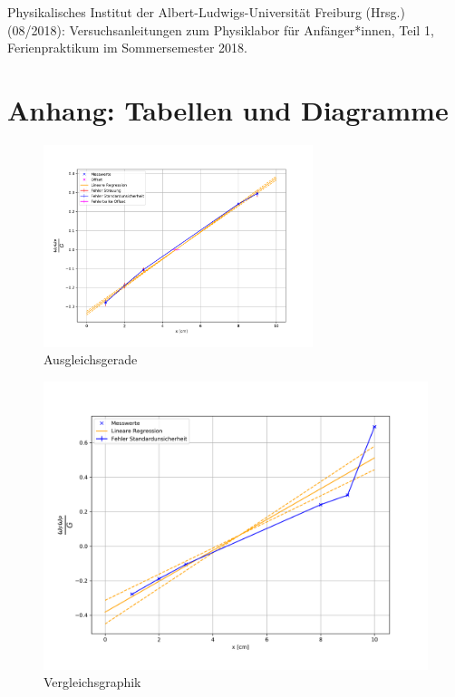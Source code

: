 \documentclass[11pt,a4paper]{article}
\begin{document}





\vfill
\begin{thebibliography}{9}
 Physikalisches Institut der Albert-Ludwigs-Universität Freiburg (Hrsg.) (08/2018): Versuchsanleitungen zum Physiklabor für Anfänger*innen, Teil 1, Ferienpraktikum im Sommersemester 2018.
\end{thebibliography}

\pagebreak

\section{Anhang: Tabellen und Diagramme}

\begin{figure}[h]
\centering
\includegraphics[width=0.7\textwidth]{discluding_10.png}
\renewcommand\thefigure{D1} \vspace{-20pt} 
\caption[Graphik Messpunkte mit Ausgleichsgerade]{Ausgleichsgerade}
\label{Abb:1}
\end{figure}

\begin{figure}[h]
\centering
\includegraphics[width=.7\textwidth]{including_10.png}
\renewcommand\thefigure{D2} \vspace{-20pt} 
\caption[Vergleichsgraphik]{Vergleichsgraphik}
\label{Abb:2}
\end{figure}
\end{document}
